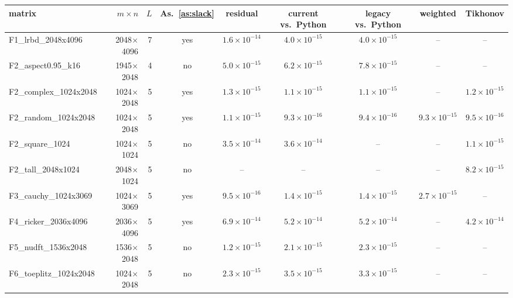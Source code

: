 \begin{tabular}{@{}lrrcccccc@{}}
\toprule
matrix & $m\times n$ & $L$ & As.~\ref{as:slack} & residual & current vs.\ Python & legacy vs.\ Python & weighted & Tikhonov\\
\midrule
F1\_lrbd\_2048x4096 & 2048$\times$4096 & 7 & yes & $1.6{\times}10^{-14}$ & $4.0{\times}10^{-15}$ & $4.0{\times}10^{-15}$ & -- & --\\
F2\_aspect0.95\_k16 & 1945$\times$2048 & 4 & no & $5.0{\times}10^{-15}$ & $6.2{\times}10^{-15}$ & $7.8{\times}10^{-15}$ & -- & --\\
F2\_complex\_1024x2048 & 1024$\times$2048 & 5 & yes & $1.3{\times}10^{-15}$ & $1.1{\times}10^{-15}$ & $1.1{\times}10^{-15}$ & -- & $1.2{\times}10^{-15}$\\
F2\_random\_1024x2048 & 1024$\times$2048 & 5 & yes & $1.1{\times}10^{-15}$ & $9.3{\times}10^{-16}$ & $9.4{\times}10^{-16}$ & $9.3{\times}10^{-15}$ & $9.5{\times}10^{-16}$\\
F2\_square\_1024 & 1024$\times$1024 & 5 & no & $3.5{\times}10^{-14}$ & $3.6{\times}10^{-14}$ & -- & -- & $1.1{\times}10^{-15}$\\
F2\_tall\_2048x1024 & 2048$\times$1024 & 5 & no & -- & -- & -- & -- & $8.2{\times}10^{-15}$\\
F3\_cauchy\_1024x3069 & 1024$\times$3069 & 5 & yes & $9.5{\times}10^{-16}$ & $1.4{\times}10^{-15}$ & $1.4{\times}10^{-15}$ & $2.7{\times}10^{-15}$ & --\\
F4\_ricker\_2036x4096 & 2036$\times$4096 & 5 & yes & $6.9{\times}10^{-14}$ & $5.2{\times}10^{-14}$ & $5.2{\times}10^{-14}$ & -- & $4.2{\times}10^{-14}$\\
F5\_nudft\_1536x2048 & 1536$\times$2048 & 5 & no & $1.2{\times}10^{-15}$ & $2.1{\times}10^{-15}$ & $2.3{\times}10^{-15}$ & -- & --\\
F6\_toeplitz\_1024x2048 & 1024$\times$2048 & 5 & no & $2.3{\times}10^{-15}$ & $3.5{\times}10^{-15}$ & $3.3{\times}10^{-15}$ & -- & --\\
\bottomrule
\end{tabular}
